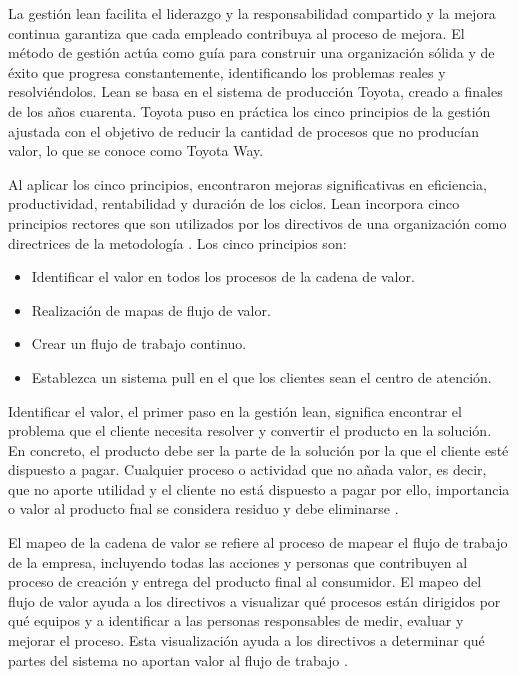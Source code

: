 La gestión lean facilita el liderazgo y la responsabilidad compartido y la mejora continua garantiza que cada empleado contribuya al proceso de mejora.
El método de gestión actúa como guía para construir una organización sólida y de éxito que progresa constantemente, identificando los problemas reales y resolviéndolos.
Lean se basa en el sistema de producción Toyota, creado a finales de los años cuarenta.
Toyota puso en práctica los cinco principios de la gestión ajustada con el objetivo de reducir la cantidad de procesos que no producían valor, lo que se conoce como Toyota Way.

Al aplicar los cinco principios, encontraron mejoras significativas en eficiencia, productividad, rentabilidad y duración de los ciclos.
Lean incorpora cinco principios rectores que son utilizados por los directivos de una organización como directrices de la metodología \cite{helmold_progress_2019}. Los cinco principios son:

\begin{itemize}
    \item Identificar el valor en todos los procesos de la cadena de valor.
    \item Realización de mapas de flujo de valor.
    \item Crear un flujo de trabajo continuo.
    \item Establezca un sistema pull en el que los clientes sean el centro de atención.
\end{itemize}

Identificar el valor, el primer paso en la gestión lean, significa encontrar el problema que el cliente necesita resolver y convertir el producto en la solución.
En concreto, el producto debe ser la parte de la solución por la que el cliente esté dispuesto a pagar.
Cualquier proceso o actividad que no añada valor, es decir, que no aporte utilidad y el cliente no está dispuesto a pagar por ello, importancia o valor al producto fnal se considera residuo y debe eliminarse \cite{liker_toyota_2006}.

El mapeo de la cadena de valor se refiere al proceso de mapear el flujo de trabajo de la empresa, incluyendo todas las acciones y personas que contribuyen al proceso de creación y entrega del producto final al consumidor.
El mapeo del flujo de valor ayuda a los directivos a visualizar qué procesos están dirigidos por qué equipos y a identificar a las personas responsables de medir, evaluar y mejorar el proceso.
Esta visualización ayuda a los directivos a determinar qué partes del sistema no aportan valor al flujo de trabajo \cite{slack_operations_2010}.

